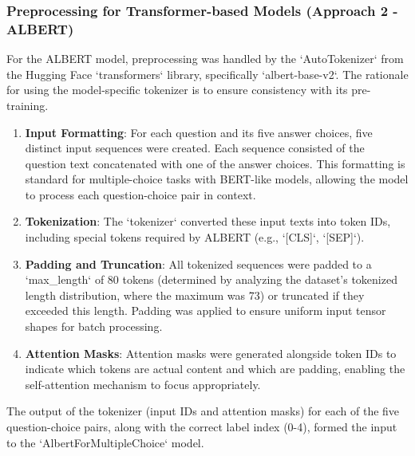 \documentclass[10.5pt]{article}
\begin{document}
\subsubsection{Preprocessing for Transformer-based Models (Approach 2 - ALBERT)}
For the ALBERT model, preprocessing was handled by the `AutoTokenizer` from the Hugging Face `transformers` library, specifically `albert-base-v2`. The rationale for using the model-specific tokenizer is to ensure consistency with its pre-training.
\begin{enumerate}
    \item \textbf{Input Formatting}: For each question and its five answer choices, five distinct input sequences were created. Each sequence consisted of the question text concatenated with one of the answer choices. This formatting is standard for multiple-choice tasks with BERT-like models, allowing the model to process each question-choice pair in context.
    \item \textbf{Tokenization}: The `tokenizer` converted these input texts into token IDs, including special tokens required by ALBERT (e.g., `[CLS]`, `[SEP]`).
    \item \textbf{Padding and Truncation}: All tokenized sequences were padded to a `max\_length` of 80 tokens (determined by analyzing the dataset's tokenized length distribution, where the maximum was 73) or truncated if they exceeded this length. Padding was applied to ensure uniform input tensor shapes for batch processing.
    \item \textbf{Attention Masks}: Attention masks were generated alongside token IDs to indicate which tokens are actual content and which are padding, enabling the self-attention mechanism to focus appropriately.
\end{enumerate}
The output of the tokenizer (input IDs and attention masks) for each of the five question-choice pairs, along with the correct label index (0-4), formed the input to the `AlbertForMultipleChoice` model.
\end{document}
